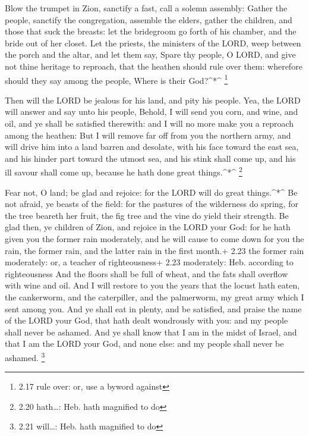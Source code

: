  Blow the trumpet in Zion, sanctify a fast, call a solemn
assembly:  Gather the people, sanctify the congregation,
assemble the elders, gather the children, and those that suck the
breasts: let the bridegroom go forth of his chamber, and the bride out
of her closet.  Let the priests, the ministers of the LORD,
weep between the porch and the altar, and let them say, Spare thy
people, O LORD, and give not thine heritage to reproach, that the
heathen should rule over them: wherefore should they say among the
people, Where is their God?\^{}*\^{} \footnote{2.17 rule over: or, use a
  byword against}

 Then will the LORD be jealous for his land, and pity his
people.  Yea, the LORD will answer and say unto his people,
Behold, I will send you corn, and wine, and oil, and ye shall be
satisfied therewith: and I will no more make you a reproach among the
heathen:  But I will remove far off from you the northern
army, and will drive him into a land barren and desolate, with his face
toward the east sea, and his hinder part toward the utmost sea, and his
stink shall come up, and his ill savour shall come up, because he hath
done great things.\^{}*\^{} \footnote{2.20 hath\ldots: Heb. hath
  magnified to do}

 Fear not, O land; be glad and rejoice: for the LORD will
do great things.\^{}*\^{}  Be not afraid, ye beasts of the
field: for the pastures of the wilderness do spring, for the tree
beareth her fruit, the fig tree and the vine do yield their strength.
 Be glad then, ye children of Zion, and rejoice in the LORD
your God: for he hath given you the former rain moderately, and he will
cause to come down for you the rain, the former rain, and the latter
rain in the first month.+ 2.23 the former rain moderately: or, a teacher
of righteousness+ 2.23 moderately: Heb. according to righteousness
 And the floors shall be full of wheat, and the fats shall
overflow with wine and oil.  And I will restore to you the
years that the locust hath eaten, the cankerworm, and the caterpiller,
and the palmerworm, my great army which I sent among you. 
And ye shall eat in plenty, and be satisfied, and praise the name of the
LORD your God, that hath dealt wondrously with you: and my people shall
never be ashamed.  And ye shall know that I am in the midst
of Israel, and that I am the LORD your God, and none else: and my people
shall never be ashamed. \footnote{2.21 will\ldots: Heb. hath magnified
  to do}


